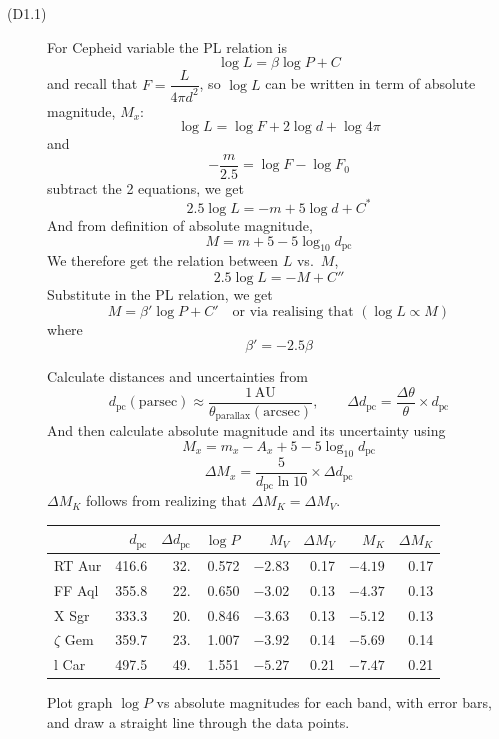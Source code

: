 \begin{description}
\item[(D1.1)] For Cepheid variable the PL relation is
  \[ \log L = \beta\log P + C \]
  and recall that $F = \dfrac{L}{4\pi d^2}$, so $\log L$ can be written in
  term of absolute magnitude, $M_x$:
  \[ \log L = \log F + 2\log d + \log 4\pi \]
  and
  \[ -\frac{m}{2.5} = \log F - \log F_0 \]
  subtract the 2 equations, we get
  \[ 2.5\log L = -m + 5\log d + C^{*} \]
  And from definition of absolute magnitude,
  \[ M = m + 5 - 5\log_{10} d_{\mathrm{pc}} \]
  We therefore get the relation between $L$ vs.\ $M$,
  \[ 2.5\log L = -M + C'' \]
  Substitute in the PL relation, we get
  \[ M = \beta'\log P + C' \quad\text{or via realising that }
     (\log L \propto M) \]
  where
  \[ \beta' = -2.5\beta \]

  Calculate distances and uncertainties from
  \[ d_{\mathrm{pc}}(\mathrm{parsec}) \approx
     \frac{1\,\mathrm{AU}}{\theta_{\mathrm{parallax}}(\mathrm{arcsec})},
     \qquad
     \Delta d_{\mathrm{pc}} = \frac{\Delta\theta}{\theta}\times
     d_{\mathrm{pc}} \]
  And then calculate absolute magnitude and its uncertainty using
  \[ M_x = m_x - A_x + 5 - 5\log_{10} d_{\mathrm{pc}} \]
  \[ \Delta M_x = \frac{5}{d_{\mathrm{pc}}\ln 10}\times
     \Delta d_{\mathrm{pc}} \]
  $\Delta M_K$ follows from realizing that $\Delta M_K = \Delta M_V$.

  \begin{center}
  \begin{tabular}{lrrrrrrr}
    & $d_{\mathrm{pc}}$ & $\Delta d_{\mathrm{pc}}$ & $\log P$ &
    $M_V$ & $\Delta M_V$ & $M_K$ & $\Delta M_K$ \\
    \hline
    RT Aur      & 416.6 & 32. & 0.572 & $-2.83$ & 0.17 & $-4.19$ & 0.17 \\
    FF Aql      & 355.8 & 22. & 0.650 & $-3.02$ & 0.13 & $-4.37$ & 0.13 \\
    X Sgr       & 333.3 & 20. & 0.846 & $-3.63$ & 0.13 & $-5.12$ & 0.13 \\
    $\zeta$ Gem & 359.7 & 23. & 1.007 & $-3.92$ & 0.14 & $-5.69$ & 0.14 \\
    l Car       & 497.5 & 49. & 1.551 & $-5.27$ & 0.21 & $-7.47$ & 0.21 \\
  \end{tabular}
  \end{center}

  Plot graph $\log P$ vs absolute magnitudes for each band, with error bars,
  and draw a straight line through the data points.


\end{description}
